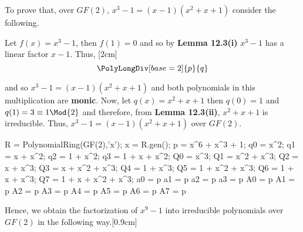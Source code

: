 To prove that, over $GF(2)$, $x^3-1 = (x-1)(x^2 + x +1)$ consider the following.

Let $f(x) = x^3-1$, then  $f(1) = 0$ and so by \textbf{Lemma 12.3(i)} $x^3-1$ has a linear factor $x-1$. Thus,
[2cm]
\[
  \PolyLongDiv[base=2]{p}{q}
\]
\begin{comment}
\[
\polylongdiv[style=A]{x^3-1}{x-1},
\]
\end{comment}
\begin{comment}
\begingroup
\begin{center}
\renewcommand*{\arraystretch}{1.1}
$\begin{array}{cccccc}
& & &\quad x^2 & + x & +1\\
\cline{3-6}
\multicolumn{2}{r}{x - 1 |}
&x^3&&&- 1\\
&&x^3&-x^2&&\\
\cline{3-4}
&&& x^2&&\\
&&& x^2&- x&\\
\cline{4-5}
&&&&x&-1\\
&&&&x&-1\\
\cline{5-6}
&&&&&\;\;0
\end{array}$
\end{center}
\endgroup
\end{comment}
and so $x^3-1 = (x-1)(x^2 + x + 1)$ and both polynomials in this multiplication are \textbf{monic}. Now, let $q(x) = x^2 + x + 1$ then $q(0) = 1$ and $q(1) = 3 \equiv 1 \Mod{2}$ and therefore, from \textbf{Lemma 12.3(ii)}, $x^2 + x + 1$ is irreducible. Thus, $x^3-1 = (x-1)(x^2 + x +1)$ over $GF(2)$.
\begin{sagesilent}
	R = PolynomialRing(GF(2),'x');
	x = R.gen();
	p = x^6 + x^3 + 1;
	q0 = x^2;
	q1 = x + x^2;
	q2 = 1 + x^2;
	q3 = 1 + x + x^2;
	Q0 = x^3;
	Q1 = x^2 + x^3;
	Q2 = x + x^3;
	Q3 = x + x^2 + x^3;
	Q4 = 1 + x^3;
	Q5 = 1 + x^2 + x^3;
	Q6 = 1 + x + x^3;
	Q7 = 1 + x + x^2 + x^3;
	a0 = p%
	a1 = p%
	a2 = p%
	a3 = p%
	A0 = p%
	A1 = p%
	A2 = p%
	A3 = p%
	A4 = p%
	A5 = p%
	A6 = p%
	A7 = p%
\end{sagesilent}
Hence, we obtain the factorization of $x^9-1$ into irreducible polynomials over $GF(2)$ in the following way.[0.9cm]
